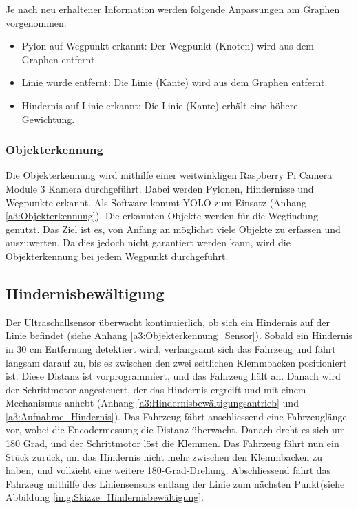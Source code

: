 \documentclass[../main.tex]{subfiles}
\begin{document}
Je nach neu erhaltener Information werden folgende Anpassungen am Graphen vorgenommen: \begin{itemize} 
  \item Pylon auf Wegpunkt erkannt: Der Wegpunkt (Knoten) wird aus dem Graphen entfernt.
  \item Linie wurde entfernt: Die Linie (Kante) wird aus dem Graphen entfernt. 
  \item Hindernis auf Linie erkannt: Die Linie (Kante) erhält eine höhere Gewichtung.
\end{itemize}

\subsubsection{Objekterkennung} \label{sub:Objekterkennung}
Die Objekterkennung wird mithilfe einer weitwinkligen Raspberry Pi Camera Module 3 Kamera durchgeführt. Dabei werden Pylonen, Hindernisse und Wegpunkte erkannt. Als Software kommt YOLO zum Einsatz (Anhang \ref{a3:Objekterkennung}). Die erkannten Objekte werden für die Wegfindung genutzt. Das Ziel ist es, von Anfang an möglichst viele Objekte zu erfassen und auszuwerten. Da dies jedoch nicht garantiert werden kann, wird die Objekterkennung bei jedem Wegpunkt durchgeführt. 

\subsection{Hindernisbewältigung}
Der Ultraschallsensor überwacht kontinuierlich, ob sich ein Hindernis auf der Linie befindet (siehe Anhang \ref{a3:Objekterkennung_Sensor}). Sobald ein Hindernis in 30 cm Entfernung detektiert wird, verlangsamt sich das Fahrzeug und fährt langsam darauf zu, bis es zwischen den zwei seitlichen Klemmbacken positioniert ist. Diese Distanz ist vorprogrammiert, und das Fahrzeug hält an. Danach wird der Schrittmotor angesteuert, der das Hindernis ergreift und mit einem Mechanismus anhebt (Anhang \ref{a3:Hindernisbewältigungsantrieb} und \ref{a3:Aufnahme_Hindernis}).
Das Fahrzeug fährt anschliessend eine Fahrzeuglänge vor, wobei die Encodermessung die Distanz überwacht. Danach dreht es sich um 180 Grad, und der Schrittmotor löst die Klemmen. Das Fahrzeug fährt nun ein Stück zurück, um das Hindernis nicht mehr zwischen den Klemmbacken zu haben, und vollzieht eine weitere 180-Grad-Drehung. Abschliessend fährt das Fahrzeug mithilfe des Liniensensors entlang der Linie zum nächsten Punkt(siehe Abbildung \ref{img:Skizze_Hindernisbewältigung}.
\end{document}

